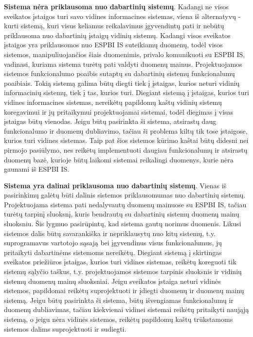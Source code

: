 \textbf{Sistema nėra priklausoma nuo dabartinių sistemų}. Kadangi ne visos sveikatos įstaigos turi savo vidines informacines sistemas, viena iš alternatyvų - kurti sistemą, kuri visus keliamus reikalavimus įgyvendintų pati ir nebūtų priklausoma nuo dabartinių įstaigų vidinių sistemų. Kadangi visos sveikatos įstaigos yra priklausomos nuo ESPBI IS suteikiamų duomenų, todėl visos sistemos, manipuliuojančios šiais duomenimis, privalo komunikuoti su ESPBI IS, vadinasi, kuriama sistema turėtų pati valdyti duomenų mainus. Projektuojamos sistemos funkcionalumo poaibis sutaptų su dabartinių sistemų funkcionalumų poaibiais. Tokią sistemą galima būtų diegti tiek į įstaigas, kurios neturi vidinių informacinių sistemų, tiek į tas, kurios turi. Diegiant sistemą į įstaigas, kurios turi vidines informacines sistemas, nereikėtų papildomų kaštų vidinių sistemų koregavimui ir jų pritaikymui projektuojamai sistemai, todėl diegimas į visas įstaigas būtų vienodas. Jeigu būtų pasirinkta ši sistema, atsirastų daug funkcionalumo ir duomenų dubliavimo, tačiau ši problema kiltų tik tose įstaigose, kurios turi vidines sistemas. Taip pat šios sistemos kūrimo kaštai būtų didesni nei pirmojo pasiūlymo, nes reikėtų implementuoti daugiau funkcionalumų ir atsirastų duomenų bazė, kurioje būtų laikomi sistemai reikalingi duomenys, kurie nėra gaunami iš ESPBI IS.

\textbf{Sistema yra dalinai priklausoma nuo dabartinių sistemų}. Vienas iš pasirinkimų galėtų būti dalinis sistemos priklausomumas nuo dabartinių sistemų. Projektuojama sistema pati nedalyvautų duomenų mainuose su ESPBI IS, tačiau turėtų tarpinį sluoksnį, kuris bendrautų su dabartinių sistemų duomenų mainų sluoksniu. Šis lygmuo pasirūpintų, kad sistema gautų norimus duomenis. Likusi sistemos dalis būtų savarankiška ir nepriklausytų nuo kitų sistemų, t.y. suprogramavus vartotojo sąsają bei įgyvendinus visus funkcionalumus, jų pritaikyti dabartinėms sistemoms nereikėtų. Diegiant sistemą į skirtingas sveikatos priežiūros įstaigas, kurios turi vidines sistemas, reikėtų koreguoti tik sistemų sąlyčio taškus, t.y. projektuojamos sistemos tarpinis sluoksnis ir vidinių sistemų duomenų mainų sluoksniai. Jeigu sveikatos įstaiga neturi vidinės sistemos, papildomai reikėtų suprojektuoti ir įdiegti duomenų ir duomenų mainų sistemą. Jeigu būtų pasirinkta ši sistema, būtų išvengiamas funkcionalumų ir duomenų dubliavimas, tačiau kiekvienai vidinei sistemai reikėtų pritaikyti naująją sistemą, o jeigu nėra vidinės sistemos, reikėtų papildomų kaštų trūkstamoms sistemos dalims suprojektuoti ir sudiegti.

